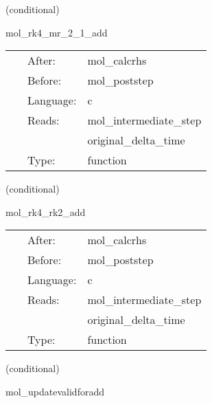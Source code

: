 \vspace{5mm}

   (conditional) 

\hspace{5mm} mol\_rk4\_mr\_2\_1\_add 

\hspace{5mm}{\it updates calculated with the multirate runge-kutta 4 method } 


\hspace{5mm}

 \begin{tabular*}{160mm}{cll} 
~ & After:  & mol\_calcrhs \\ 
~ & Before:  & mol\_poststep \\ 
~ & Language:  & c \\ 
~ & Reads:  & mol\_intermediate\_step \\ 
~& ~ &original\_delta\_time\\ 
~ & Type:  & function \\ 
\end{tabular*} 


\vspace{5mm}

   (conditional) 

\hspace{5mm} mol\_rk4\_rk2\_add 

\hspace{5mm}{\it updates calculated with the multirate rk4/rk2 method } 


\hspace{5mm}

 \begin{tabular*}{160mm}{cll} 
~ & After:  & mol\_calcrhs \\ 
~ & Before:  & mol\_poststep \\ 
~ & Language:  & c \\ 
~ & Reads:  & mol\_intermediate\_step \\ 
~& ~ &original\_delta\_time\\ 
~ & Type:  & function \\ 
\end{tabular*} 


\vspace{5mm}

   (conditional) 

\hspace{5mm} mol\_updatevalidforadd 

\hspace{5mm}{\it automatically update valid regions based on mol } 


